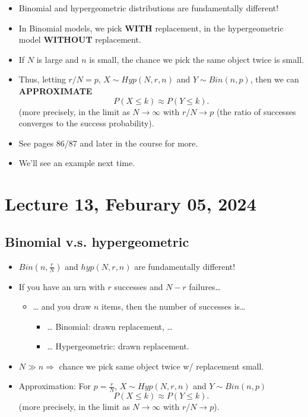 \documentclass[
]{book}
\providecommand{\tightlist}{%
  \setlength{\itemsep}{0pt}\setlength{\parskip}{0pt}}
\theoremstyle{definition}
\theoremstyle{definition}
\theoremstyle{definition}
\theoremstyle{definition}
\theoremstyle{remark}
\begin{document}
\begin{itemize}
\tightlist
\item
  Binomial and hypergeometric distributions are fundamentally different!
\item
  In Binomial models, we pick \textbf{WITH} replacement, in the hypergeometric model \textbf{WITHOUT} replacement.
\item
  If \(N\) is large and \(n\) is small, the chance we pick the same object twice is small.
\item
  Thus, letting \(r/N=p\), \(X\sim Hyp(N,r,n)\) and \(Y\sim Bin(n,p)\), then we can \textbf{APPROXIMATE}
  \[ P(X \leq k) \approx P(Y\leq k).\]
  (more precisely, in the limit as \(N\rightarrow\infty\) with \(r/N\rightarrow p\) (the ratio of successes converges to the success probability).
\item
  See pages 86/87 and later in the course for more.
\item
  We'll see an example next time.
\end{itemize}

\hypertarget{lecture-13-feburary-05-2024}{%
\chapter{Lecture 13, Feburary 05, 2024}\label{lecture-13-feburary-05-2024}}

\hypertarget{binomial-v.s.-hypergeometric}{%
\section{Binomial v.s. hypergeometric}\label{binomial-v.s.-hypergeometric}}

\begin{itemize}
\tightlist
\item
  \(Bin(n,\frac{r}{N})\) and \(hyp(N,r,n)\) are fundamentally different!
\item
  If you have an urn with \(r\) successes and \(N-r\) failures\ldots{}

  \begin{itemize}
  \tightlist
  \item
    \ldots{} and you draw \(n\) items, then the number of successes is\ldots{}

    \begin{itemize}
    \tightlist
    \item
      \ldots{} Binomial: drawn  replacement, \ldots{}
    \item
      \ldots{} Hypergeometric: drawn  replacement.
    \end{itemize}
  \end{itemize}
\item
  \(N\gg n \Rightarrow\) chance we pick same object twice w/ replacement small.
\item
  \alert{Approximation:} For \(p=\frac{r}{N}\), \(X\sim Hyp(N,r,n)\) and \(Y\sim Bin(n,p)\)
  \[ P(X \leq k) \approx P(Y\leq k).\]
  (more precisely, in the limit as \(N\rightarrow\infty\) with \(r/N\rightarrow p\)).
\end{itemize}
\end{document}
